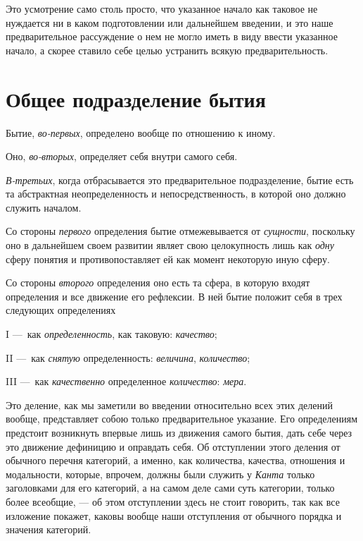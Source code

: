 Это усмотрение само столь просто, что указанное начало как таковое не
нуждается ни в каком подготовлении или дальнейшем введении, и это наше
предварительное рассуждение о нем не могло иметь в виду ввести указанное
начало, а скорее ставило себе целью устранить всякую предварительность.

\section[Общее подразделение бытия]{Общее подразделение бытия}
Бытие, {\em во-первых},
определено вообще по отношению к иному.

Оно, {\em во-вторых}, определяет себя внутри самого
себя.

{\em В-третьих}, когда отбрасывается это предварительное
подразделение, бытие есть та абстрактная неопределенность и
непосредственность, в которой оно должно служить началом.

Со стороны {\em первого} определения бытие
отмежевывается от {\em сущности}, поскольку оно в
дальнейшем своем развитии являет свою целокупность лишь как
{\em одну} сферу понятия и противопоставляет ей как
момент некоторую иную сферу.

Со стороны {\em второго} определения оно есть та сфера,
в которую входят определения и все движение его рефлексии. В ней бытие
положит себя в трех следующих определениях

I —~как {\em определенность}, как таковую:
{\em качество};

II —~как {\em снятую} определенность:
{\em величина}, {\em количество};

III —~как {\em качественно} определенное
{\em количество}: {\em мера}.

Это деление, как мы заметили во введении относительно всех этих делений
вообще, представляет собою только предварительное указание. Его
определениям предстоит возникнуть впервые лишь из движения самого бытия,
дать себе через это движение дефиницию и оправдать себя. Об отступлении
этого деления от обычного перечня категорий, а именно, как количества,
качества, отношения и модальности, которые, впрочем, должны были служить у
{\em Канта} только заголовками для его категорий, а на
самом деле сами суть категории, только более всеобщие, — об этом
отступлении здесь не стоит говорить, так как все изложение покажет, каковы
вообще наши отступления от обычного порядка и значения категорий.

